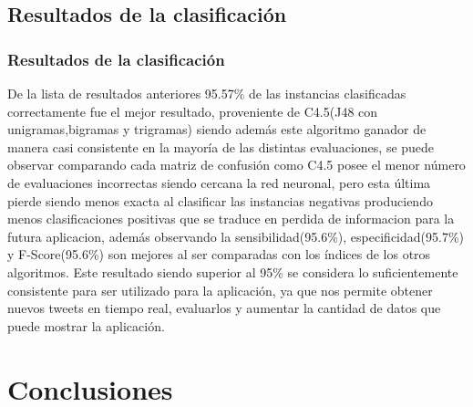 \documentclass{beamer}
\newcommand\Fontvi{\fontsize{10}{7.2}\selectfont}
\begin{document}


\subsection{Resultados de la clasificaci\'{o}n}
\begin{frame}
\frametitle{Resultados de la clasificaci\'{o}n}
\Fontvi
De la lista de resultados anteriores 95.57\% de las instancias clasificadas correctamente fue el mejor resultado, proveniente de C4.5(J48 con unigramas,bigramas y trigramas) siendo adem\'{a}s este algoritmo ganador de manera casi consistente en la mayor\'{i}a de las distintas evaluaciones, se puede observar comparando cada matriz de confusi\'{o}n como C4.5 posee el menor número de evaluaciones incorrectas siendo cercana la red neuronal, pero esta última pierde siendo menos exacta al clasificar las instancias negativas produciendo menos clasificaciones positivas que se traduce en perdida de informacion para la futura aplicacion, adem\'{a}s observando la sensibilidad(95.6\%), especificidad(95.7\%) y F-Score(95.6\%) son mejores al ser comparadas con los \'{i}ndices de los otros algoritmos. 
Este resultado siendo superior al 95\% se considera lo suficientemente consistente para ser utilizado para la aplicaci\'{o}n, ya que nos permite obtener nuevos tweets en tiempo real, evaluarlos y aumentar la cantidad de datos que puede mostrar la aplicaci\'{o}n. 

\end{frame}




\section{Conclusiones}
\end{document}
